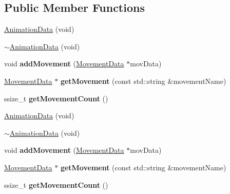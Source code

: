 \subsection*{Public Member Functions}
\begin{DoxyCompactItemize}
\item 
\hyperlink{classcocostudio_1_1AnimationData_aab73e793e8c295358507c9809a5cad9c}{Animation\+Data} (void)
\item 
\hyperlink{classcocostudio_1_1AnimationData_a233ce2ece1b1430deec207913be340b1}{$\sim$\+Animation\+Data} (void)
\item 
\mbox{\label{classcocostudio_1_1AnimationData_a2e9b53ccf2ee8c8541ff5eb14ceffbc9}} 
void {\bfseries add\+Movement} (\hyperlink{classcocostudio_1_1MovementData}{Movement\+Data} $\ast$mov\+Data)
\item 
\mbox{\label{classcocostudio_1_1AnimationData_a7945f44bd55a5e76522ae0a046f173de}} 
\hyperlink{classcocostudio_1_1MovementData}{Movement\+Data} $\ast$ {\bfseries get\+Movement} (const std\+::string \&movement\+Name)
\item 
\mbox{\label{classcocostudio_1_1AnimationData_a884d90aabd9dfb26d816df2865ada30d}} 
ssize\+\_\+t {\bfseries get\+Movement\+Count} ()
\item 
\hyperlink{classcocostudio_1_1AnimationData_aab73e793e8c295358507c9809a5cad9c}{Animation\+Data} (void)
\item 
\hyperlink{classcocostudio_1_1AnimationData_a233ce2ece1b1430deec207913be340b1}{$\sim$\+Animation\+Data} (void)
\item 
\mbox{\label{classcocostudio_1_1AnimationData_a2e9b53ccf2ee8c8541ff5eb14ceffbc9}} 
void {\bfseries add\+Movement} (\hyperlink{classcocostudio_1_1MovementData}{Movement\+Data} $\ast$mov\+Data)
\item 
\mbox{\label{classcocostudio_1_1AnimationData_a57469a12b4a847d6c5c54777375373cc}} 
\hyperlink{classcocostudio_1_1MovementData}{Movement\+Data} $\ast$ {\bfseries get\+Movement} (const std\+::string \&movement\+Name)
\item 
\mbox{\label{classcocostudio_1_1AnimationData_a884d90aabd9dfb26d816df2865ada30d}} 
ssize\+\_\+t {\bfseries get\+Movement\+Count} ()
\end{DoxyCompactItemize}

